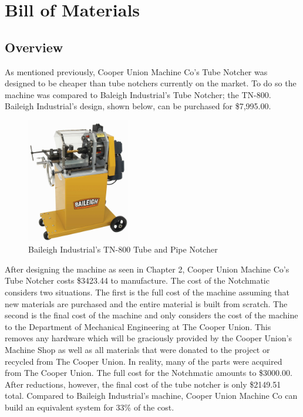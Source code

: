 \chapter{Bill of Materials}

\section{Overview}

As mentioned previously, Cooper Union Machine Co's Tube Notcher was designed to be cheaper than tube notchers currently on the market. To do so the machine was compared to Baleigh Industrial's Tube Notcher; the TN-800. Baileigh Industrial's design, shown below, can be purchased for \$7,995.00.

\begin{figure}[hbp]
    \centering
    \includegraphics[width=0.4\textwidth]{./images/Chapter4-BillofMaterials/TN-800}
    \caption{Baileigh Industrial's TN-800 Tube and Pipe Notcher}
    \label{fig:Baileigh Industrial}
\end{figure}

After designing the machine as seen in Chapter 2, Cooper Union Machine Co's Tube Notcher costs \$3423.44 to manufacture. The cost of the Notchmatic considers two situations. The first is the full cost of the machine assuming that new materials are purchased and the entire material is built from scratch. The second is the final cost of the machine and only considers the cost of the machine to the Department of Mechanical Engineering at The Cooper Union. This removes any hardware which will be graciously provided by the Cooper Union's Machine Shop as well as all materials that were donated to the project or recycled from The Cooper Union. In reality, many of the parts were acquired from The Cooper Union. The full cost for the Notchmatic amounts to \$3000.00. After reductions, however, the final cost of the tube notcher is only \$2149.51 total. Compared to Baileigh Industrial's machine, Cooper Union Machine Co can build an equivalent system for 33\% of the cost. 

